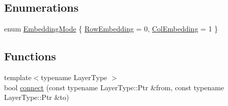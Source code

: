 \subsection*{Enumerations}
\begin{DoxyCompactItemize}
\item 
enum \hyperlink{namespaceffnn_1_1layer_a254f16beba4fb335d935e9b43bb9e69a}{Embedding\-Mode} \{ \hyperlink{namespaceffnn_1_1layer_a254f16beba4fb335d935e9b43bb9e69aa91eb0d1f175a08e2b2991cae348c827d}{Row\-Embedding} = 0, 
\hyperlink{namespaceffnn_1_1layer_a254f16beba4fb335d935e9b43bb9e69aa42ac01b35d45fd60256ef5008c96c049}{Col\-Embedding} = 1
 \}
\end{DoxyCompactItemize}
\subsection*{Functions}
\begin{DoxyCompactItemize}
\item 
{\footnotesize template$<$typename Layer\-Type $>$ }\\bool \hyperlink{namespaceffnn_1_1layer_a33fc9c6c7eb5fbdef14e0aa0db97dd13}{connect} (const typename Layer\-Type\-::\-Ptr \&from, const typename Layer\-Type\-::\-Ptr \&to)
\end{DoxyCompactItemize}


